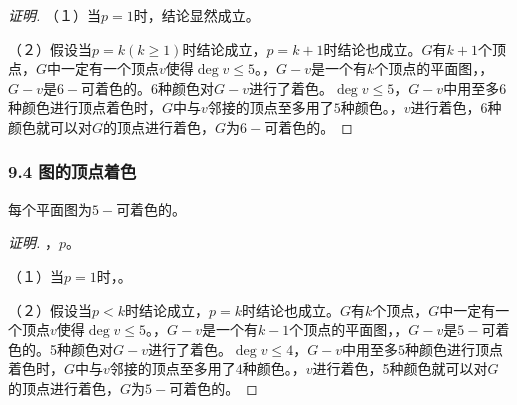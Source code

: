 \documentclass{beamer}
\begin{document}
\begin{CJK}{UTF8}{gbsn}
\begin{frame}
\begin{proof}[证明]
   \pause （１）当$p=1$时，结论显然成立。

   \pause （２）假设当$p=k(k\geq 1)$时结论成立，$p=k+1$时结论也成立。$G$有$k+1$个顶点，$G$中一定有一个顶点$v$使得$\deg v \leq 5$。，\pause$G-v$是一个有$k$个顶点的平面图，，\pause$G-v$是$6-$可着色的。$6$种颜色对$G-v$进行了着色。$\deg v \leq 5$，$G-v$中用至多$6$种颜色进行顶点着色时，$G$中与$v$邻接的顶点至多用了$5$种颜色。，$v$进行着色，$6$种颜色就可以对$G$的顶点进行着色，$G$为$6-$可着色的。
  \end{proof}
\end{frame}
\begin{frame}
  \frametitle{9.4 图的顶点着色}
  \begin{Thm}
    每个平面图为$5-$可着色的。
  \end{Thm}
  \pause\begin{proof}[证明]\justifying\let\raggedright\justifying
  ，$p$。

  \pause（１）当$p=1$时，。

  \pause（２）假设当$p<k$时结论成立，$p=k$时结论也成立。$G$有$k$个顶点，$G$中一定有一个顶点$v$使得$\deg v \leq 5$。，\pause$G-v$是一个有$k-1$个顶点的平面图，，\pause$G-v$是$5-$可着色的。5种颜色对$G-v$进行了着色。$\deg v \leq 4$，$G-v$中用至多$5$种颜色进行顶点着色时，$G$中与$v$邻接的顶点至多用了$4$种颜色。，$v$进行着色，5种颜色就可以对$G$的顶点进行着色，$G$为$5-$可着色的。

\renewcommand{\qedsymbol}{}    
\end{proof}


\end{frame}
\end{CJK}
\end{document}
